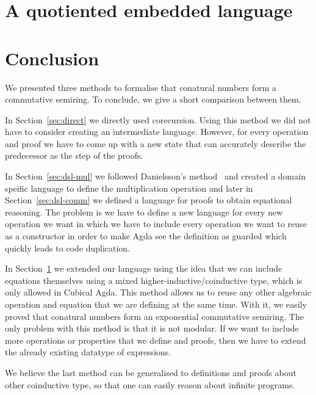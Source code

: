 \documentclass[sigplan, screen, natbib=false, review]{acmart}
\begin{document}

\section{A quotiented embedded language}\label{sec:quotiented}



\section{Conclusion}

We presented three methods to formalise that conatural numbers form a
commutative semiring. To conclude, we give a short comparison between them.

In Section~\ref{sec:direct} we directly used corecursion. Using this method we
did not have to consider creating an intermediate language. However, for every
operation and proof we have to come up with a new state that can accurately
describe the predecessor as the step of the proofs.

In Section~\ref{sec:dsl-mul} we followed Danielsson's
method~\cite{danielsson-beating} and created a domain speific language to define
the multiplication operation and later in Section~\ref{sec:dsl-comm} we defined
a language for proofs to obtain equational reasoning. The problem is we have to
define a new language for every new operation we want in which we have to
include every operation we want to reuse as a constructor in order to make Agda
see the definition as guarded which quickly leads to code duplication.

In Section~\ref{sec:quotiented} we extended our language using the idea that we
can include equations themselves using a mixed higher-inductive/coinductive
type, which is only allowed in Cubical Agda. This method allows us to reuse any
other algebraic operation and equation that we are defining at the same time.
With it, we easily proved that conatural numbers form an exponential commutative
semiring. The only problem with this method is that it is not modular. If we
want to include more operations or properties that we define and proofs, then we
have to extend the already existing datatype of expressions.

We believe the last method can be generalised to definitions and proofs about
other coinductive type, so that one can easily reason about infinite programs.
\end{document}
